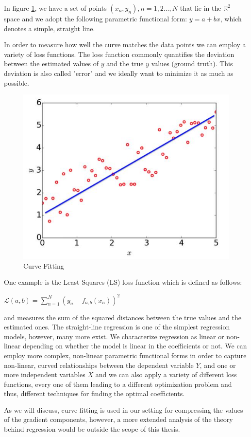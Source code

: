    In figure \ref{curve_fit}, we have a set of points $(x_n, y_n), n=1,2\dots,N$ that lie in the $\mathbb{R}^2$ space
    and we adopt the following parametric functional form: $y=a+bx$, which denotes a simple, straight line.
    
    In order to measure how well the curve matches the data points we can employ a variety of  
    loss functions.
    The loss function commonly quantifies the deviation between the estimated values of $y$ and the true $y$ values (ground truth).
    This deviation is also called "error" and we ideally want to minimize it as much as possible.
    
    
    \begin{figure}[h]
    \centering
    \includegraphics[scale=0.5]{thesis/figures/curve-fitting.jpg}
    \caption{Curve Fitting}
    \label{curve_fit}
    \end{figure}
    
    One example is the Least Squares (LS) loss function which is defined as follows:
    \begin{flushleft}
    \centering
    \setlength{\parindent}{40ex} 
    $\mathcal{L}(a,b) = \sum_{n=1}^N (y_n-f_{a,b}(x_n))^2$
    \end{flushleft}

    and measures the sum of the squared distances between the true values and the estimated ones.
    The straight-line regression is one of the simplest regression models, however, many more exist.
    We characterize regression as linear or non-linear depending on whether the model is linear in the coefficients or not.
    We can employ more complex, non-linear parametric functional forms in order to capture 
    non-linear, curved relationships between the dependent variable $Y$, and one or more independent variables $X$
    and we can also apply a variety of different loss functions, every one of them leading to a different optimization problem and thus,
    different techniques for finding the optimal coefficients.
    
    As we will discuss, curve fitting is used in our setting for compressing the values of the gradient components, however, a more extended analysis of the theory behind regression would be outside the scope of this thesis.
    
    